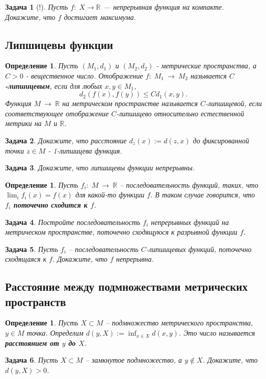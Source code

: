 \documentclass[12pt]{book}
\newcommand{\arrow}{{\:\longrightarrow\:}}
\def\R{{\mathbb R}}
\theoremstyle{upshape}
\newtheorem{zadacha}{Задача}[chapter]
\theoremstyle{generic}
\newtheorem{opredelenie}[teorema]{Определение}
\newtheorem{remark}[teorema]{Замечание}
\def\замечание{\begin{remark}}
\def\еза{\end{remark}}
\theoremstyle{upshapenonumber}
\newcommand{\следствие}{%
     \refstepcounter{teorema}
     {\noindent\bf Следствие \thechapter.\arabic{teorema}:\ }}
\newcommand{\пример}{%
     \refstepcounter{teorema}
     {\noindent\bf Пример \thechapter.\arabic{teorema}:\ }}
\newcommand{\лемма}{%
     \refstepcounter{teorema}
     {\noindent\bf Лемма \thechapter.\arabic{teorema}:\ }}
\newcommand{\теорема}{%
     \refstepcounter{teorema}
     {\noindent\bf Теорема \thechapter.\arabic{teorema}:\ }}
\newcommand{\утверждение}{%
     \refstepcounter{teorema}
     {\noindent\bf Утверждение \thechapter.\arabic{teorema}:\ }}
\def\бф{\bf}
\def\ем{\em}
\def\задача{\begin{zadacha}}
\def\ез{\end{zadacha}}
\def\еу{\end{ukazanie}}
\def\определение{\begin{opredelenie}}
\def\ео{\end{opredelenie}}
\def\енум{\begin{enumerate}}
\def\ее{\end{enumerate}}
\begin{document}
{\begin{zadacha}[!] Пусть $f:\; X \to \R$ --- непрерывная функция
на компакте. Докажите, что $f$ достигает максимума.
\end{zadacha}


\subsection*{Липшицевы функции}

\определение
Пусть $(M_1, d_1)$ и $(M_2, d_2)$ - метрические
пространства, а $C>0$ - вещественное число. 
Отображение $f:\; M_1 \arrow M_2$ называется {\bf 
$C$-липшицевым}, если для любых
$x, y\in M_1$, 
\[
d_2(f(x),f(y)) \leq C d_1 (x, y).
\]
Функция $M \arrow \R$ на метрическом пространстве
называется $C$-липшицевой, если соответствующее
отображение $C$-липшицево относительно естественной
метрики на $M$ и $\R$.
\ео

\задача
Докажите, что расстояние $d_z(x) := d(z,x)$ 
до фиксированной точки $z\in M$ - 1-липшицева функция.
\ез

\задача
Докажите, что липшицевы функции непрерывны.
\ез

\определение
Пусть $f_i:\; M \arrow \R$ -- последовательность
функций, таких, что $\lim_i f_i(x)=f(x)$ для какой-то
функции $f$. В таком случае говорится, что
{\бф $f_i$ поточечно сходится к $f$}.
\ео

\задача
Постройте последовательность $f_i$ непрерывных функций
на метрическом пространстве,
поточечно сходящуюся к разрывной функции $f$.
\ез

\задача
Пусть $f_i$ -- последовательность $C$-липшицевых функций,
поточечно сходящаяся к $f$. Докажите, что $f$ непрерывна.
\ез


\subsection*{Расстояние между подмножествами метрических пространств}


\определение
Пусть $X\subset M$ -- подмножество метрического пространства,
$y\in M$ точка. Определим $d(y, X):= \inf_{x\in X}d(x,y)$.
Это число называется {\бф расстоянием от $y$ до $X$}.
\ео


\задача
Пусть $X\subset M$ -- замкнутое подмножество,
а $y\notin X$. Докажите, что $d(y,X)>0$.
\ез

}
\end{document}
